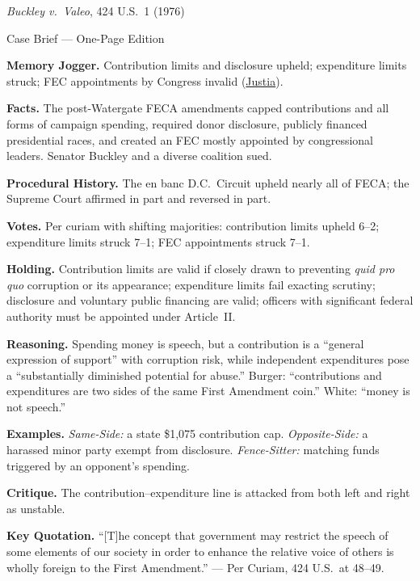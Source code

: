 \documentclass[12pt]{article}
\begin{document}
\begin{center}
{\Large \textit{Buckley v.\ Valeo}, 424 U.S.\ 1 (1976)\par}
\vspace{0.3em}
{\normalsize Case Brief --- One-Page Edition\par}
\end{center}

\textbf{Memory Jogger.} Contribution limits and disclosure upheld; expenditure limits struck; FEC appointments by Congress invalid (\href{https://supreme.justia.com/cases/federal/us/424/1/}{Justia}).

\textbf{Facts.} The post-Watergate FECA amendments capped contributions and all forms of campaign spending, required donor disclosure, publicly financed presidential races, and created an FEC mostly appointed by congressional leaders. Senator Buckley and a diverse coalition sued.

\textbf{Procedural History.} The en banc D.C.\ Circuit upheld nearly all of FECA; the Supreme Court affirmed in part and reversed in part.

\textbf{Votes.} Per curiam with shifting majorities: contribution limits upheld 6--2; expenditure limits struck 7--1; FEC appointments struck 7--1.

\textbf{Holding.} Contribution limits are valid if closely drawn to preventing \textit{quid pro quo} corruption or its appearance; expenditure limits fail exacting scrutiny; disclosure and voluntary public financing are valid; officers with significant federal authority must be appointed under Article~II.

\textbf{Reasoning.} Spending money is speech, but a contribution is a ``general expression of support'' with corruption risk, while independent expenditures pose a ``substantially diminished potential for abuse.'' Burger: ``contributions and expenditures are two sides of the same First Amendment coin.'' White: ``money is not speech.''

\textbf{Examples.} \emph{Same-Side:} a state \$1,075 contribution cap. \emph{Opposite-Side:} a harassed minor party exempt from disclosure. \emph{Fence-Sitter:} matching funds triggered by an opponent's spending.

\textbf{Critique.} The contribution--expenditure line is attacked from both left and right as unstable.

\textbf{Key Quotation.} ``[T]he concept that government may restrict the speech of some elements of our society in order to enhance the relative voice of others is wholly foreign to the First Amendment.'' --- Per Curiam, 424 U.S.\ at 48--49.
\end{document}
